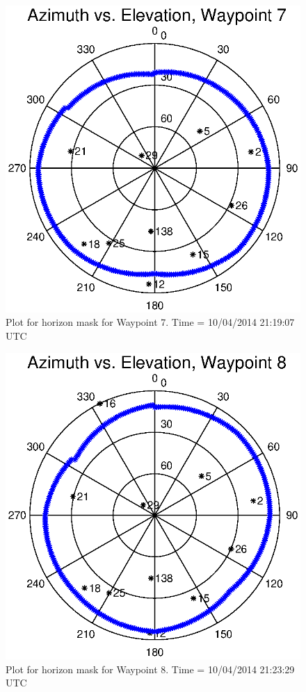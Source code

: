 \documentclass[]{aiaa-tc}%
\begin{document}
	\begin{figure}[H]
		\centering
		\includegraphics[width = 13cm]{AzElWaypoint7.eps}
		\caption{Plot for horizon mask for Waypoint 7. Time = 10/04/2014 21:19:07 UTC}
		\label{fig:AzElWaypoint7}
	\end{figure}
	
	\begin{figure}[H]
		\centering
		\includegraphics[width = 13cm]{AzElWaypoint8.eps}
		\caption{Plot for horizon mask for Waypoint 8. Time = 10/04/2014 21:23:29 UTC}
		\label{fig:AzElWaypoint8}
	\end{figure}
	
\end{document}
